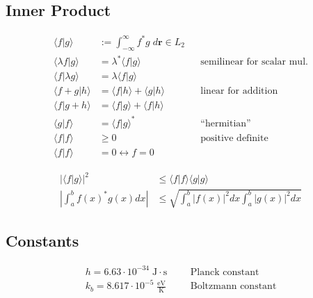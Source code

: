 \subsection{Inner Product}\label{ssec:InnerProd}
\noindent\begin{align*}
    \langle f|g \rangle         & := \int_{-\infty}^{\infty} f^* g\; d \mathbf{r} \in L_2 &  &                                   \\
    \langle \lambda f|g \rangle & =\lambda^* \langle f|g \rangle                          &  & \text{semilinear for scalar mul.} \\
    \langle f|\lambda g \rangle & =\lambda \langle f|g \rangle                                                                   \\
    \langle f+g|h \rangle       & =\langle f|h \rangle + \langle g|h \rangle              &  & \text{linear for addition}        \\
    \langle f|g+h \rangle       & =\langle f|g \rangle + \langle f|h \rangle                                                     \\
    \langle g|f \rangle         & = {\langle f|g \rangle}^*                               &  & \text{``hermitian''}              \\
    \langle f|f \rangle         & \ge 0                                                   &  & \text{positive definite}          \\
    \langle f|f \rangle         & = 0 \leftrightarrow f=0
\end{align*}

\begin{align*}
    |\langle f|g \rangle |^2                  & \leq \langle f|f \rangle \langle g|g \rangle                 \\
    \left|\int_{a}^{b}{f(x)}^{*}g(x)dx\right| & \leq \sqrt{\int_{a}^{b}|f(x)|^{2}dx\int_{a}^{b}|g(x)|^{2}dx}
\end{align*}

\subsection{Constants}
\noindent\begin{align*}
    h = 6.63 \cdot 10^{-34} \;\mathrm{J\cdot s}      &  &  & \text{Planck constant}    \\
    k_b =8.617 \cdot 10^{-5} \;\mathrm{\frac{eV}{K}} &  &  & \text{Boltzmann constant}
\end{align*}

